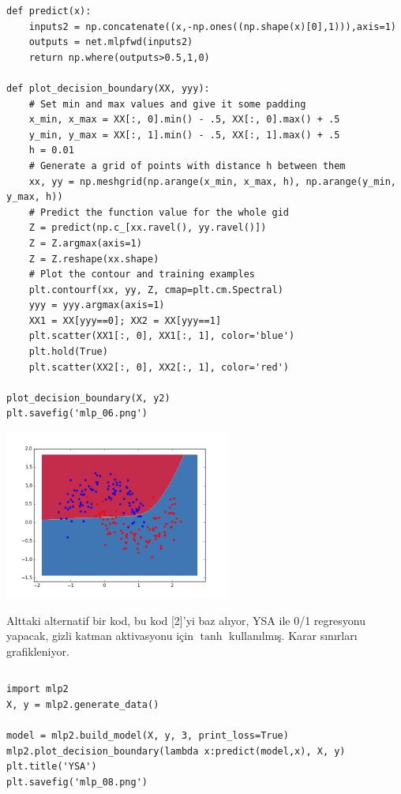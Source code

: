 \documentclass[12pt,fleqn]{article}\usepackage{../../common}
\begin{document}
\begin{verbatim}
def predict(x): 
    inputs2 = np.concatenate((x,-np.ones((np.shape(x)[0],1))),axis=1)
    outputs = net.mlpfwd(inputs2)
    return np.where(outputs>0.5,1,0)

def plot_decision_boundary(XX, yyy):
    # Set min and max values and give it some padding
    x_min, x_max = XX[:, 0].min() - .5, XX[:, 0].max() + .5
    y_min, y_max = XX[:, 1].min() - .5, XX[:, 1].max() + .5
    h = 0.01
    # Generate a grid of points with distance h between them
    xx, yy = np.meshgrid(np.arange(x_min, x_max, h), np.arange(y_min, y_max, h))
    # Predict the function value for the whole gid
    Z = predict(np.c_[xx.ravel(), yy.ravel()])
    Z = Z.argmax(axis=1)
    Z = Z.reshape(xx.shape)
    # Plot the contour and training examples
    plt.contourf(xx, yy, Z, cmap=plt.cm.Spectral)
    yyy = yyy.argmax(axis=1)
    XX1 = XX[yyy==0]; XX2 = XX[yyy==1]
    plt.scatter(XX1[:, 0], XX1[:, 1], color='blue')
    plt.hold(True)
    plt.scatter(XX2[:, 0], XX2[:, 1], color='red')

plot_decision_boundary(X, y2)
plt.savefig('mlp_06.png')
\end{verbatim}

\includegraphics[width=20em]{mlp_06.png}

Alttaki alternatif bir kod, bu kod [2]'yi baz alıyor, YSA ile 0/1
regresyonu yapacak, gizli katman aktivasyonu için $\tanh$
kullanılmış. Karar sınırları grafikleniyor.

\inputminted[fontsize=\footnotesize]{python}{mlp2.py}

\begin{verbatim}
import mlp2
X, y = mlp2.generate_data()

model = mlp2.build_model(X, y, 3, print_loss=True)
mlp2.plot_decision_boundary(lambda x:predict(model,x), X, y)
plt.title('YSA')
plt.savefig('mlp_08.png')
\end{verbatim}
\end{document}
